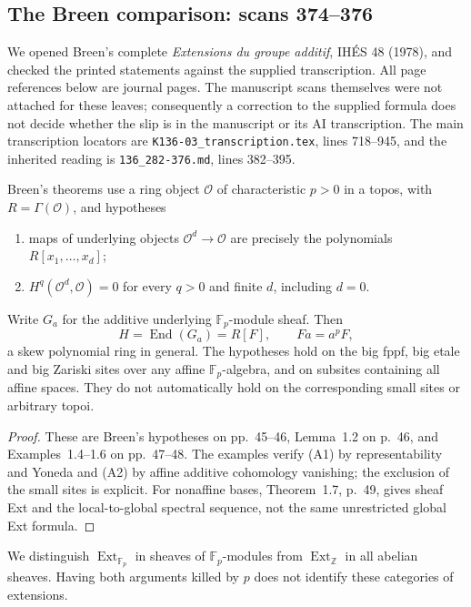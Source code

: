 \subsection{The Breen comparison: scans 374--376}

We opened Breen's complete \emph{Extensions du groupe additif},
IH\'ES 48 (1978), and checked the printed statements against the
supplied transcription. All page references below are journal
pages. The manuscript scans themselves were not attached for these
leaves; consequently a correction to the supplied formula does
not decide whether the slip is in the manuscript or its AI
transcription. The main transcription locators are
\texttt{K136-03\_transcription.tex}, lines 718--945, and the inherited
reading is \texttt{136\_282-376.md}, lines 382--395.

\begin{proposition}
\label{sa08:D013}
Breen's theorems use a ring object $\mathcal O$ of characteristic
$p>0$ in a topos, with $R=\Gamma(\mathcal O)$, and hypotheses
\begin{enumerate}
\item[(A1)] maps of underlying objects $\mathcal O^d\to\mathcal O$
are precisely the polynomials $R[x_1,\ldots,x_d]$;
\item[(A2)] $H^q(\mathcal O^d,\mathcal O)=0$ for every $q>0$
and finite $d$, including $d=0$.
\end{enumerate}
Write $G_a$ for the additive underlying $\mathbb F_p$-module
sheaf. Then
\[
 H=\operatorname{End}(G_a)=R[F],\qquad Fa=a^pF,
\]
a skew polynomial ring in general. The hypotheses hold on the
big fppf, big etale and big Zariski sites over any affine
$\mathbb F_p$-algebra, and on subsites containing all affine
spaces. They do not automatically hold on the corresponding
small sites or arbitrary topoi.
\end{proposition}
\begin{proof}
These are Breen's hypotheses on pp.~45--46, Lemma~1.2 on p.~46,
and Examples~1.4--1.6 on pp.~47--48. The examples verify (A1)
by representability and Yoneda and (A2) by affine additive
cohomology vanishing; the exclusion of the small sites is explicit.
For nonaffine bases, Theorem~1.7, p.~49, gives sheaf Ext and the
local-to-global spectral sequence, not the same unrestricted
global Ext formula.
\end{proof}

We distinguish $\operatorname{Ext}_{\mathbb F_p}$ in sheaves of
$\mathbb F_p$-modules from $\operatorname{Ext}_{\mathbb Z}$ in
all abelian sheaves. Having both arguments killed by $p$ does not
identify these categories of extensions.

